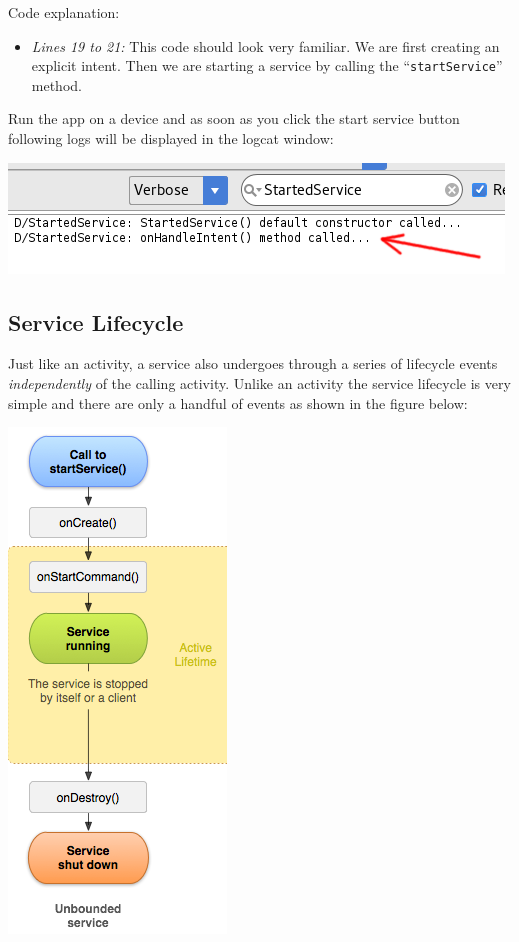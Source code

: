 Code explanation:
\begin{itemize}
	\item \textit{Lines 19 to 21:} This code should look very familiar. We are first creating an explicit intent. Then we are starting a service by calling the ``\texttt{startService}'' method. 
\end{itemize}

Run the app on a device and as soon as you click the start service button following logs will be displayed in the logcat window:

\begin{center}
	\includegraphics[scale=\SourceCodeScale]{chapters/ch14/images/8}
\end{center}

\subsection{Service Lifecycle}
\label{TAS:serviceLifecycle}
Just like an activity, a service also undergoes through a series of lifecycle events \textit{independently} of the calling activity. Unlike an activity the service lifecycle is very simple and there are only a handful of events as shown in the figure below:

\begin{center}
	\includegraphics[scale=\FigureScale]{chapters/ch14/images/9}
\end{center}

